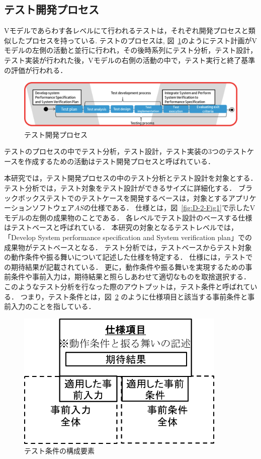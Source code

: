 \subsection{テスト開発プロセス}
Vモデルであらわす各レベルにて行われるテストは，それぞれ開発プロセスと類似したプロセスを持っている.
テストのプロセスは, 図~\ref{fig:D-2-Fig2}のようにテスト計画がVモデルの左側の活動と並行に行われ，その後時系列にテスト分析，テスト設計，テスト実装が行われた後，Vモデルの右側の活動の中で，テスト実行と終了基準の評価が行われる．
\begin{figure}[htbp]
  \begin{center}
  \includegraphics[width=14cm]{./image/D-2-Fig2.png}
  \caption{テスト開発プロセス}
  \label{fig:D-2-Fig2}
  \end{center}
\end{figure}
テストのプロセスの中でテスト分析，テスト設計，テスト実装の3つのテストケースを作成するための活動はテスト開発プロセスと呼ばれている\cite{ISTQB}．

本研究では，テスト開発プロセスの中のテスト分析とテスト設計を対象とする．
テスト分析では，テスト対象をテスト設計ができるサイズに詳細化する．
ブラックボックステストでのテストケースを開発するベースは，対象とするアプリケーションソフトウェア$AS$の仕様である．
仕様とは，図~\ref{fig:D-2-Fig1}で示したVモデルの左側の成果物のことである．
各レベルでテスト設計のベースする仕様はテストベースと呼ばれている．
本研究の対象となるテストレベルでは，「Develop System performance specification and System verification plan」での成果物がテストベースとなる．
テスト分析では，テストベースからテスト対象の動作条件や振る舞いについて記述した仕様を特定する．
仕様には，テストでの期待結果が記載されている．
更に，動作条件や振る舞いを実現するための事前条件や事前入力は，期待結果と照らしあわせて適切なものを取捨選択する．
このようなテスト分析を行なった際のアウトプットは，テスト条件と呼ばれている．
つまり，テスト条件とは，図~\ref{fig:D-4-Fig1} のように仕様項目と該当する事前条件と事前入力のことを指している．
\begin{figure}[h]
  \begin{center}
  \includegraphics[width=10cm]{./image/D-4-Fig1.png}
  \caption{テスト条件の構成要素}
  \label{fig:D-4-Fig1}
  \end{center}
   \end{figure}

